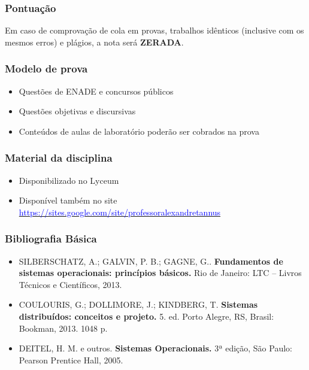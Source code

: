 \documentclass[aspectratio=169,
				xcolor=table]{beamer}
\begin{document}
	\begin{frame}
		\frametitle{Pontuação}
		\begin{center}
			\Huge \alert {Em caso de comprovação de cola em provas, trabalhos idênticos (inclusive com os mesmos erros) e plágios, a nota será \textbf{ZERADA}.}		
		\end{center}
	\end{frame}
	
	\begin{frame}
		\frametitle{Modelo de prova}
		\begin{itemize}
			\item Questões de ENADE e concursos públicos
			\vspace{1em}
			\item Questões objetivas e discursivas
			\vspace{1em}
			\item Conteúdos de aulas de laboratório poderão ser cobrados na prova
		\end{itemize}
	\end{frame}
	
	\begin{frame}
		\frametitle{Material da disciplina}
		\begin{itemize}
			\item Disponibilizado no Lyceum
			\vspace{1em}
			\item Disponível também no site \href{https://sites.google.com/site/professoralexandretannus}{\textcolor{blue}{https://sites.google.com/site/professoralexandretannus}}  
		\end{itemize}
	\end{frame}
	
	\begin{frame}
		\frametitle{Bibliografia Básica}
		\begin{itemize}
			\vspace{1em}
			\item SILBERSCHATZ, A.; GALVIN, P. B.; GAGNE, G.. \textbf{Fundamentos de sistemas operacionais: princípios básicos.} Rio de Janeiro: LTC – Livros Técnicos e Científicos, 2013.
			\vspace{1em}
			\item COULOURIS, G.; DOLLIMORE, J.; KINDBERG, T. \textbf{Sistemas distribuídos: conceitos e projeto.} 5. ed. Porto Alegre, RS, Brasil: Bookman, 2013. 1048 p. 
			\vspace{1em}
			\item DEITEL, H. M. e outros. \textbf{Sistemas Operacionais.} 3ª edição, São Paulo: Pearson Prentice Hall, 2005.

		\end{itemize}
	\end{frame}
	
\end{document}

